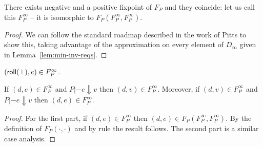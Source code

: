 \documentclass[preprint,nocopyrightspace]{sigplanconf}
\begin{document}
\begin{lemma} There exists negative and a positive fixpoint of $F_{P}$ and they coincide: let us call this
$F_{P}^\infty$ -- it is isomorphic to $F_{P}(F_P^\infty,F_P^\infty)$.
\end{lemma}
\begin{proof}
We can follow the standard roadmap described in the work of Pitts to show this, taking 
advantage of the approximation on every element of $D_{\infty}$ given in 
Lemma~\ref{lem:min-inv-reqs}.
\end{proof}

\begin{lemma}\label{lem:bot-in-fix}
$(\mathsf{roll}(\bot),e) \in F_{P}^\infty$. \end{lemma}

\begin{lemma}\label{lem:eval-respecting}
If $(d,e) \in F_{P}^\infty$ and $P |- e \Downarrow v$ then $(d,v) \in F_{P}^\infty$.
Moreover, if $(d,v) \in F_{P}^\infty$ and $P |- e \Downarrow v$ then $(d,e) \in F_{P}^\infty$.
\end{lemma}
\begin{proof}
For the first part, 
if $(d,e) \in F_{P}^\infty$ then $(d,e) \in F_{P}(F_{P}^\infty,F_{P}^\infty)$. 
By the definition of $F_{P}(\cdot,\cdot)$ and by rule  the 
result follows. The second part is a similar case analysis.
\end{proof}
\end{document}
